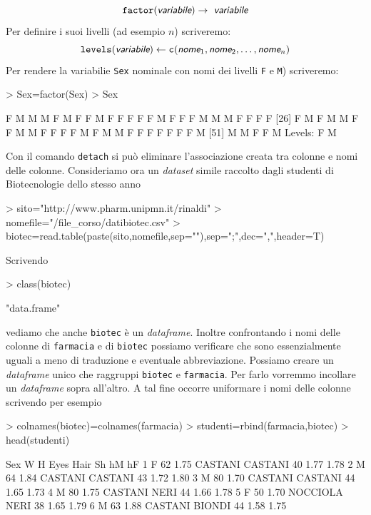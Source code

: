\documentclass[onecolumn,12pt]{book}
\newcommand{\varia}[1]{\textsl{\textsf{#1}}}
\begin{document}
$$\texttt{factor}(\varia{variabile})\rightarrow\varia{ variabile}$$
Per definire i suoi livelli (ad esempio $n$) scriveremo:
$$\texttt{levels}(\varia{variabile})\leftarrow\texttt{c}(\varia{nome}_1,\varia{nome}_2,\ldots,\varia{nome}_n)$$
Per rendere la variabilie \texttt{Sex} nominale con nomi dei livelli
\texttt{F} e \texttt{M})  scriveremo:
\begin{Schunk}
\begin{Sinput}
> Sex=factor(Sex)
> Sex
\end{Sinput}
\begin{Soutput}
 [1] F M M M F M F F M F F F F F M F F F M M M F F F F
[26] F M F M M F F M M F F F F M F M M F F F F F F F M
[51] M M F F M
Levels: F M
\end{Soutput}
\end{Schunk}
Con il comando
\texttt{detach}   si pu\`o eliminare l'associazione creata tra colonne e nomi delle colonne.
Consideriamo ora un \emph{dataset} simile raccolto dagli studenti di Biotecnologie dello stesso anno
\begin{Schunk}
\begin{Sinput}
> sito="http://www.pharm.unipmn.it/rinaldi"
> nomefile="/file_corso/datibiotec.csv"
> biotec=read.table(paste(sito,nomefile,sep=""),sep=";",dec=",",header=T)
\end{Sinput}
\end{Schunk}
Scrivendo
\begin{Schunk}
\begin{Sinput}
> class(biotec)
\end{Sinput}
\begin{Soutput}
[1] "data.frame"
\end{Soutput}
\end{Schunk}
vediamo che anche \texttt{biotec} \`e un \emph{dataframe}.  Inoltre confrontando i nomi delle colonne di \texttt{farmacia} e di \texttt{biotec} possiamo verificare che sono essenzialmente uguali a meno di traduzione e eventuale abbreviazione.
Possiamo creare un \emph{dataframe} unico che raggruppi \texttt{biotec} e \texttt{farmacia}. Per farlo  vorremmo incollare un \emph{dataframe} sopra all'altro.
A tal fine occorre uniformare i nomi delle colonne scrivendo per esempio
\begin{Schunk}
\begin{Sinput}
> colnames(biotec)=colnames(farmacia)
> studenti=rbind(farmacia,biotec)
> head(studenti)
\end{Sinput}
\begin{Soutput}
  Sex  W    H     Eyes    Hair Sh   hM   hF
1   F 62 1.75  CASTANI CASTANI 40 1.77 1.78
2   M 64 1.84  CASTANI CASTANI 43 1.72 1.80
3   M 80 1.70  CASTANI CASTANI 44 1.65 1.73
4   M 80 1.75  CASTANI    NERI 44 1.66 1.78
5   F 50 1.70 NOCCIOLA    NERI 38 1.65 1.79
6   M 63 1.88  CASTANI  BIONDI 44 1.58 1.75
\end{Soutput}
\end{Schunk}
\end{document}

